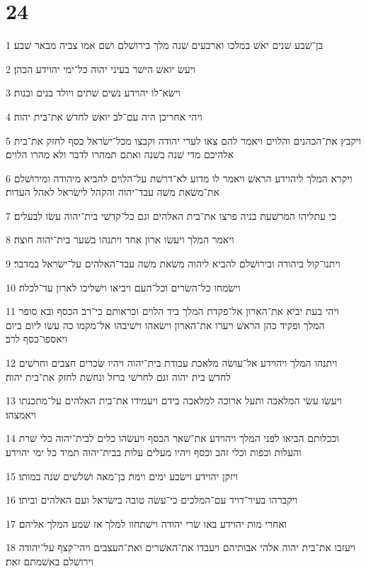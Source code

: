 \chapter{24}

\par 1 בן־שׁבע שׁנים יאשׁ במלכו וארבעים שׁנה מלך בירושׁלם ושׁם אמו צביה מבאר שׁבע׃
\par 2 ויעשׂ יואשׁ הישׁר בעיני יהוה כל־ימי יהוידע הכהן׃
\par 3 וישׂא־לו יהוידע נשׁים שׁתים ויולד בנים ובנות׃
\par 4 ויהי אחריכן היה עם־לב יואשׁ לחדשׁ את־בית יהוה׃
\par 5 ויקבץ את־הכהנים והלוים ויאמר להם צאו לערי יהודה וקבצו מכל־ישׂראל כסף לחזק את־בית אלהיכם מדי שׁנה בשׁנה ואתם תמהרו לדבר ולא מהרו הלוים׃
\par 6 ויקרא המלך ליהוידע הראשׁ ויאמר לו מדוע לא־דרשׁת על־הלוים להביא מיהודה ומירושׁלם את־משׂאת משׁה עבד־יהוה והקהל לישׂראל לאהל העדות׃
\par 7 כי עתליהו המרשׁעת בניה פרצו את־בית האלהים וגם כל־קדשׁי בית־יהוה עשׂו לבעלים׃
\par 8 ויאמר המלך ויעשׂו ארון אחד ויתנהו בשׁער בית־יהוה חוצה׃
\par 9 ויתנו־קול ביהודה ובירושׁלם להביא ליהוה משׂאת משׁה עבד־האלהים על־ישׂראל במדבר׃
\par 10 וישׂמחו כל־השׂרים וכל־העם ויביאו וישׁליכו לארון עד־לכלה׃
\par 11 ויהי בעת יביא את־הארון אל־פקדת המלך ביד הלוים וכראותם כי־רב הכסף ובא סופר המלך ופקיד כהן הראשׁ ויערו את־הארון וישׂאהו וישׁיבהו אל־מקמו כה עשׂו ליום ביום ויאספו־כסף לרב׃
\par 12 ויתנהו המלך ויהוידע אל־עושׂה מלאכת עבודת בית־יהוה ויהיו שׂכרים חצבים וחרשׁים לחדשׁ בית יהוה וגם לחרשׁי ברזל ונחשׁת לחזק את־בית יהוה׃
\par 13 ויעשׂו עשׂי המלאכה ותעל ארוכה למלאכה בידם ויעמידו את־בית האלהים על־מתכנתו ויאמצהו׃
\par 14 וככלותם הביאו לפני המלך ויהוידע את־שׁאר הכסף ויעשׂהו כלים לבית־יהוה כלי שׁרת והעלות וכפות וכלי זהב וכסף ויהיו מעלים עלות בבית־יהוה תמיד כל ימי יהוידע׃
\par 15 ויזקן יהוידע וישׂבע ימים וימת בן־מאה ושׁלשׁים שׁנה במותו׃
\par 16 ויקברהו בעיר־דויד עם־המלכים כי־עשׂה טובה בישׂראל ועם האלהים וביתו׃
\par 17 ואחרי מות יהוידע באו שׂרי יהודה וישׁתחוו למלך אז שׁמע המלך אליהם׃
\par 18 ויעזבו את־בית יהוה אלהי אבותיהם ויעבדו את־האשׁרים ואת־העצבים ויהי־קצף על־יהודה וירושׁלם באשׁמתם זאת׃
